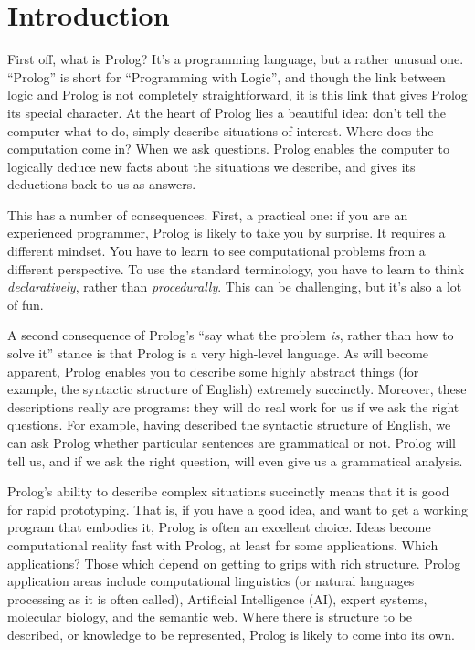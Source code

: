 
\chapter*{Introduction}\label{INTRODUCTION}

First off, what is Prolog? It's a programming language, but a rather
unusual one. ``Prolog'' is short for ``Programming with Logic'', and
though the link between logic and Prolog is not completely
straightforward, it is this link that gives Prolog its special
character.  At the heart of Prolog lies a beautiful idea: don't tell
the computer what to do, simply describe situations of interest. Where
does the computation come in? When we ask questions.  Prolog enables
the computer to logically deduce new facts about the situations we
describe, and gives its deductions back to us as answers.

This has a number of consequences. First, a practical one: if you are
an experienced programmer, Prolog is likely to take you by
surprise. It requires a different mindset.  You have to learn to see
computational problems from a different perspective.  To use the
standard terminology, you have to learn to think
\textit{declaratively}, rather than \textit{procedurally}.  This can
be challenging, but it's also a lot of fun.

A second consequence of Prolog's ``say what the problem \textit{is},
rather than how to solve it'' stance is that Prolog is a very
high-level language. As will become apparent, Prolog enables you to
describe some highly abstract things (for example, the syntactic
structure of English) extremely succinctly. Moreover, these
descriptions really are programs: they will do real work for us if we
ask the right questions. For example, having described the syntactic
structure of English, we can ask Prolog whether particular sentences
are grammatical or not. Prolog will tell us, and if we ask the right
question, will even give us a grammatical analysis.

Prolog's ability to describe complex situations succinctly means that
it is good for rapid prototyping.  That is, if you have a good idea,
and want to get a working program that embodies it, Prolog is often an
excellent choice. Ideas become computational reality fast with Prolog,
at least for some applications.  Which applications?  Those which
depend on getting to grips with rich structure.  Prolog application
areas include computational linguistics (or natural languages
processing as it is often called), Artificial Intelligence (AI),
expert systems, molecular biology, and the semantic web. Where there
is structure to be described, or knowledge to be represented, Prolog
is likely to come into its own.

